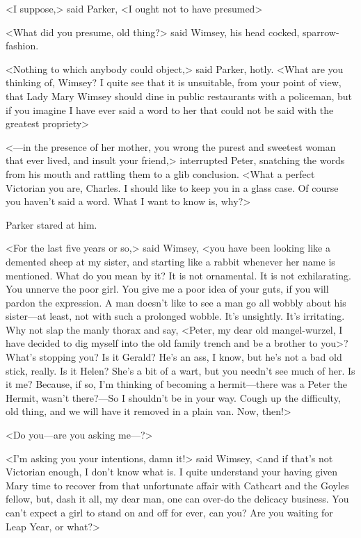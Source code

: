 <I suppose,> said Parker, <I ought not to have presumed\longdash>

<What did you presume, old thing?> said Wimsey, his head cocked, sparrow-fashion.

<Nothing to which anybody could object,> said Parker, hotly. <What are you thinking of, Wimsey? I quite see that it is unsuitable, from your point of view, that Lady Mary Wimsey should dine in public restaurants with a policeman, but if you imagine I have ever said a word to her that could not be said with the greatest propriety\longdash>

<—in the presence of her mother, you wrong the purest and sweetest woman that ever lived, and insult your friend,> interrupted Peter, snatching the words from his mouth and rattling them to a glib conclusion. <What a perfect Victorian you are, Charles. I should like to keep you in a glass case. Of course you haven't said a word. What I want to know is, why?>

Parker stared at him.

<For the last five years or so,> said Wimsey, <you have been looking like a demented sheep at my sister, and starting like a rabbit whenever her name is mentioned. What do you mean by it? It is not ornamental. It is not exhilarating. You unnerve the poor girl. You give me a poor idea of your guts, if you will pardon the expression. A man doesn't like to see a man go all wobbly about his sister—at least, not with such a prolonged wobble. It's unsightly. It's irritating. Why not slap the manly thorax and say, <Peter, my dear old mangel-wurzel, I have decided to dig myself into the old family trench and be a brother to you>? What's stopping you? Is it Gerald? He's an ass, I know, but he's not a bad old stick, really. Is it Helen? She's a bit of a wart, but you needn't see much of her. Is it me? Because, if so, I'm thinking of becoming a hermit—there was a Peter the Hermit, wasn't there?—So I shouldn't be in your way. Cough up the difficulty, old thing, and we will have it removed in a plain van. Now, then!>

<Do you—are you asking me—?>

<I'm asking you your intentions, damn it!> said Wimsey, <and if that's not Victorian enough, I don't know what is. I quite understand your having given Mary time to recover from that unfortunate affair with Cathcart and the Goyles fellow, but, dash it all, my dear man, one can over-do the delicacy business. You can't expect a girl to stand on and off for ever, can you? Are you waiting for Leap Year, or what?>

